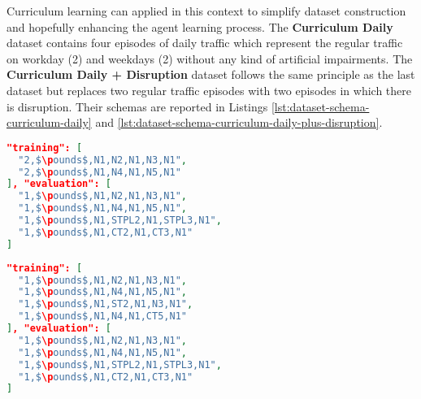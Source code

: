 Curriculum learning can applied in this context to simplify dataset construction and hopefully enhancing the agent learning process.
The \textbf{Curriculum Daily} dataset contains four episodes of daily traffic which represent the regular traffic on workday (2) and weekdays (2) without any kind of artificial impairments.
The \textbf{Curriculum Daily + Disruption} dataset follows the same principle as the last dataset but replaces two regular traffic episodes with two episodes in which there is disruption.
Their schemas are reported in Listings \ref{lst:dataset-schema-curriculum-daily} and \ref{lst:dataset-schema-curriculum-daily-plus-disruption}.

\noindent
\begin{minipage}{\linewidth}
\begin{lstlisting}[language=JSON, caption=The schema for the "Curriculum Daily" Dataset, label={lst:dataset-schema-curriculum-daily}, mathescape=true]
"training": [
  "2,$\pounds$,N1,N2,N1,N3,N1",
  "2,$\pounds$,N1,N4,N1,N5,N1"
], "evaluation": [
  "1,$\pounds$,N1,N2,N1,N3,N1",
  "1,$\pounds$,N1,N4,N1,N5,N1",
  "1,$\pounds$,N1,STPL2,N1,STPL3,N1",
  "1,$\pounds$,N1,CT2,N1,CT3,N1"
]
\end{lstlisting}
\end{minipage}

\noindent
\begin{minipage}{\linewidth}
\begin{lstlisting}[language=JSON, caption=The schema for the "Curriculum Daily + Disruption" Dataset, label={lst:dataset-schema-curriculum-daily-plus-disruption}, mathescape=true]
"training": [
  "1,$\pounds$,N1,N2,N1,N3,N1",
  "1,$\pounds$,N1,N4,N1,N5,N1",
  "1,$\pounds$,N1,ST2,N1,N3,N1",
  "1,$\pounds$,N1,N4,N1,CT5,N1"
], "evaluation": [
  "1,$\pounds$,N1,N2,N1,N3,N1",
  "1,$\pounds$,N1,N4,N1,N5,N1",
  "1,$\pounds$,N1,STPL2,N1,STPL3,N1",
  "1,$\pounds$,N1,CT2,N1,CT3,N1"
]
\end{lstlisting}
\end{minipage}


